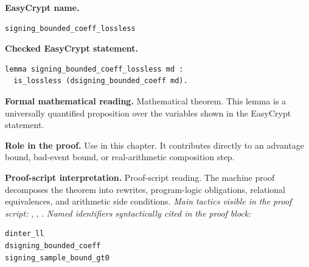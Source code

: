\begin{formaltheorem}
\noindent\textbf{EasyCrypt name.}
\begin{lstlisting}[language=EasyCrypt,basicstyle=\ttfamily\scriptsize]
signing_bounded_coeff_lossless
\end{lstlisting}
\noindent\textbf{Checked EasyCrypt statement.}
\begin{lstlisting}[language=EasyCrypt,basicstyle=\ttfamily\scriptsize]
lemma signing_bounded_coeff_lossless md :
  is_lossless (dsigning_bounded_coeff md).
\end{lstlisting}
\noindent\textbf{Formal mathematical reading.}
Mathematical theorem. This lemma is a universally quantified proposition over the variables shown in the EasyCrypt statement.

\noindent\textbf{Role in the proof.}
Use in this chapter. It contributes directly to an advantage bound, bad-event bound, or real-arithmetic composition step.

\noindent\textbf{Proof-script interpretation.}
Proof-script reading. The machine proof decomposes the theorem into rewrites, program-logic obligations, relational equivalences, and arithmetic side conditions.
\emph{Main tactics visible in the proof script:} , , .
\emph{Named identifiers syntactically cited in the proof block:}
\begin{lstlisting}[language=EasyCrypt,basicstyle=\ttfamily\scriptsize]
dinter_ll
dsigning_bounded_coeff
signing_sample_bound_gt0
\end{lstlisting}

\end{formaltheorem}

